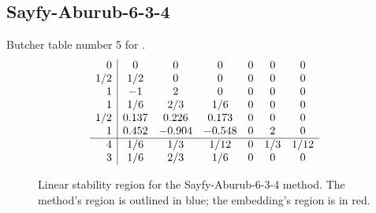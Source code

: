 \documentclass[letterpaper,10pt,english]{sphinxmanual}
\begin{document}
\subsection{Sayfy-Aburub-6-3-4}
\label{Butcher:butcher-sayfy-aburub}\label{Butcher:sayfy-aburub-6-3-4}
Butcher table number 5
for {\hyperref[c_interface/User_callable:c.ARKodeSetERKTableNum]{\emph{}}}.
\begin{gather}
\begin{split}\begin{array}{r|cccccc}
  0 & 0 & 0 & 0 & 0 & 0 & 0 \\
  1/2 & 1/2 & 0 & 0 & 0 & 0 & 0 \\
  1 & -1 & 2 & 0 & 0 & 0 & 0 \\
  1 & 1/6 & 2/3 & 1/6 & 0 & 0 & 0 \\
  1/2 & 0.137 & 0.226 & 0.173 & 0 & 0 & 0 \\
  1 & 0.452 & -0.904 & -0.548 & 0 & 2 & 0 \\
  \hline
  4 & 1/6 & 1/3 & 1/12 & 0 & 1/3 & 1/12 \\
  3 & 1/6 & 2/3 & 1/6 & 0 & 0 & 0
\end{array}\end{split}\notag
\end{gather}\begin{figure}[htbp]
\centering
\capstart

\caption{Linear stability region for the Sayfy-Aburub-6-3-4 method.  The method's
region is outlined in blue; the embedding's region is in red.}\end{figure}
\end{document}
